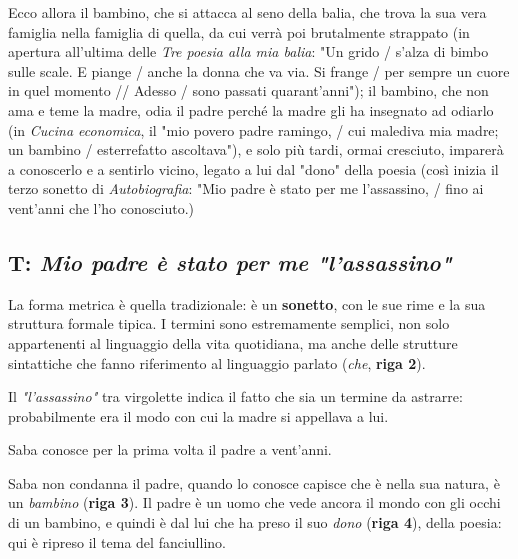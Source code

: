 Ecco allora il bambino, che si attacca al seno della balia, che trova la sua vera famiglia nella famiglia di quella, da cui verrà poi brutalmente strappato (in apertura all'ultima delle \textit{Tre poesia alla mia balia}: "Un grido / s'alza di bimbo sulle scale. E piange / anche la donna che va via. Si frange / per sempre un cuore in quel momento // Adesso / sono passati quarant'anni"); il bambino, che non ama e teme la madre, odia il padre perché la madre gli ha insegnato ad odiarlo (in \textit{Cucina economica}, il "mio povero padre ramingo, / cui malediva mia madre; un bambino / esterrefatto ascoltava"), e solo più tardi, ormai cresciuto, imparerà a conoscerlo e a sentirlo vicino, legato a lui dal "dono" della poesia (così inizia il terzo sonetto di \textit{Autobiografia}: "Mio padre è stato per me l'assassino, / fino ai vent'anni che l'ho conosciuto.)

\subsection{T: \textit{Mio padre è stato per me "l'assassino"}}

La forma metrica è quella tradizionale: è un \textbf{sonetto}, con le sue rime e la sua struttura formale tipica. I termini sono estremamente semplici, non solo appartenenti al linguaggio della vita quotidiana, ma anche delle strutture sintattiche che fanno riferimento al linguaggio parlato (\textit{che}, \textbf{riga 2}).

Il \textit{"l'assassino"} tra virgolette indica il fatto che sia un termine da astrarre: probabilmente era il modo con cui la madre si appellava a lui.

Saba conosce per la prima volta il padre a vent'anni.

Saba non condanna il padre, quando lo conosce capisce che è nella sua natura, è un \textit{bambino} (\textbf{riga 3}). Il padre è un uomo che vede ancora il mondo con gli occhi di un bambino, e quindi è dal lui che ha preso il suo \textit{dono} (\textbf{riga 4}), della poesia: qui è ripreso il tema del fanciullino.

